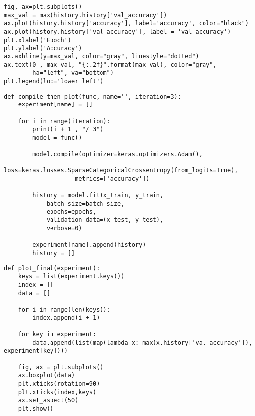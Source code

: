\documentclass{article}
\begin{document}
\begin{lstlisting}[caption={Additional modifications to the plot}, label={lst:graph}]
fig, ax=plt.subplots()
max_val = max(history.history['val_accuracy'])
ax.plot(history.history['accuracy'], label='accuracy', color="black")
ax.plot(history.history['val_accuracy'], label = 'val_accuracy')
plt.xlabel('Epoch')
plt.ylabel('Accuracy')
ax.axhline(y=max_val, color="gray", linestyle="dotted")
ax.text(0 , max_val, "{:.2f}".format(max_val), color="gray", 
        ha="left", va="bottom")
plt.legend(loc='lower left')
\end{lstlisting}

\begin{lstlisting}[caption={Helper function to run experiment 3 times and save results to dictionary}, label={lst:helper}]
def compile_then_plot(func, name='', iteration=3):
    experiment[name] = [] 

    for i in range(iteration):
        print(i + 1 , "/ 3")
        model = func()

        model.compile(optimizer=keras.optimizers.Adam(),
                    loss=keras.losses.SparseCategoricalCrossentropy(from_logits=True),
                    metrics=['accuracy'])

        history = model.fit(x_train, y_train,
            batch_size=batch_size,
            epochs=epochs,
            validation_data=(x_test, y_test),
            verbose=0)

        experiment[name].append(history)
        history = []
\end{lstlisting}

\begin{lstlisting}[caption={Helper function to draw a box plot}, label={lst:box}]
def plot_final(experiment):
    keys = list(experiment.keys())
    index = []
    data = []

    for i in range(len(keys)):
        index.append(i + 1)

    for key in experiment:
        data.append(list(map(lambda x: max(x.history['val_accuracy']), experiment[key])))

    fig, ax = plt.subplots()
    ax.boxplot(data)
    plt.xticks(rotation=90)
    plt.xticks(index,keys)
    ax.set_aspect(50)
    plt.show()
\end{lstlisting}
\newpage
\printbibliography
\end{document}
